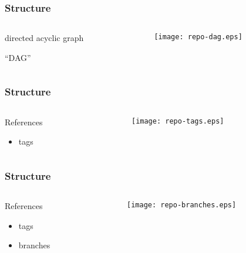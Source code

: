 \documentclass[english]{beamer}
\begin{document}
\begin{frame}
\frametitle{Structure}
\begin{columns}[t]
        \begin{column}[T]{.5\textwidth}
                directed acyclic graph

                \vspace{.1\textheight}
                ``DAG''
        \end{column}
        \begin{column}[T]{.5\textwidth}
                \texttt{[image: repo-dag.eps]}
        \end{column}
\end{columns}

\end{frame}

\begin{frame}
\frametitle{Structure}
\begin{columns}[t]
        \begin{column}[T]{.5\textwidth}
                References
                \begin{itemize}
                        \item tags
                \end{itemize}
        \end{column}
        \begin{column}[T]{.5\textwidth}
                \texttt{[image: repo-tags.eps]}
        \end{column}
\end{columns}

\end{frame}

\begin{frame}
\frametitle{Structure}
\begin{columns}[t]
        \begin{column}[T]{.5\textwidth}
                References
                \begin{itemize}
                        \item tags
                        \item branches
                \end{itemize}
        \end{column}
        \begin{column}[T]{.5\textwidth}
                \texttt{[image: repo-branches.eps]}
        \end{column}
\end{columns}

\end{frame}
\end{document}
